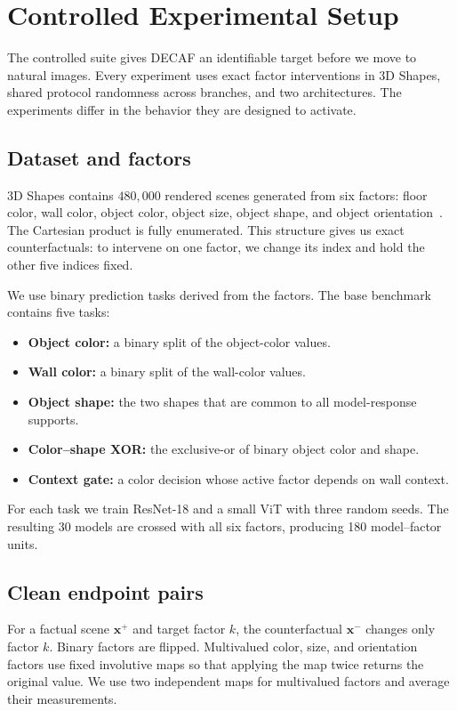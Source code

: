 \section{Controlled Experimental Setup}
\label{app:controlled-setup}

The controlled suite gives DECAF an identifiable target before we move to natural images. Every experiment uses exact factor interventions in 3D Shapes, shared protocol randomness across branches, and two architectures. The experiments differ in the behavior they are designed to activate.

\subsection{Dataset and factors}

3D Shapes contains $480{,}000$ rendered scenes generated from six factors: floor color, wall color, object color, object size, object shape, and object orientation~\citep{burgess2018understanding}. The Cartesian product is fully enumerated. This structure gives us exact counterfactuals: to intervene on one factor, we change its index and hold the other five indices fixed.

We use binary prediction tasks derived from the factors. The base benchmark contains five tasks:
\begin{itemize}[leftmargin=1.4em,itemsep=2pt,topsep=3pt]
    \item \textbf{Object color:} a binary split of the object-color values.
    \item \textbf{Wall color:} a binary split of the wall-color values.
    \item \textbf{Object shape:} the two shapes that are common to all model-response supports.
    \item \textbf{Color--shape XOR:} the exclusive-or of binary object color and shape.
    \item \textbf{Context gate:} a color decision whose active factor depends on wall context.
\end{itemize}
For each task we train ResNet-18 and a small ViT with three random seeds. The resulting 30 models are crossed with all six factors, producing 180 model--factor units.

\subsection{Clean endpoint pairs}

For a factual scene $\mathbf{x}^{+}$ and target factor $k$, the counterfactual $\mathbf{x}^{-}$ changes only factor $k$. Binary factors are flipped. Multivalued color, size, and orientation factors use fixed involutive maps so that applying the map twice returns the original value. We use two independent maps for multivalued factors and average their measurements.

